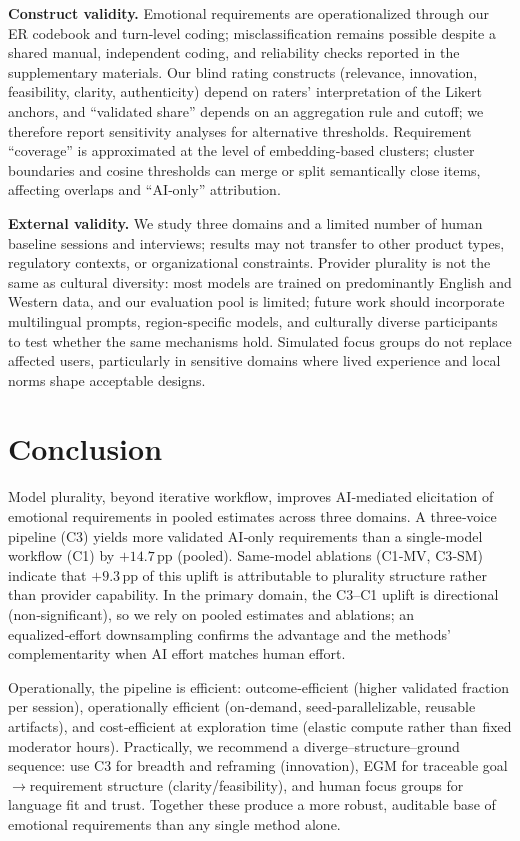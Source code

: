 \documentclass[acmsmall]{acmart}
\begin{document}
\textbf{Construct validity.}
Emotional requirements are operationalized through our ER codebook and turn‑level coding; misclassification remains possible despite a shared manual, independent coding, and reliability checks reported in the supplementary materials. Our blind rating constructs (relevance, innovation, feasibility, clarity, authenticity) depend on raters’ interpretation of the Likert anchors, and “validated share” depends on an aggregation rule and cutoff; we therefore report sensitivity analyses for alternative thresholds. Requirement “coverage” is approximated at the level of embedding‑based clusters; cluster boundaries and cosine thresholds can merge or split semantically close items, affecting overlaps and “AI‑only” attribution.


\textbf{External validity.}
We study three domains and a limited number of human baseline sessions and interviews; results may not transfer to other product types, regulatory contexts, or organizational constraints. Provider plurality is not the same as cultural diversity: most models are trained on predominantly English and Western data, and our evaluation pool is limited; future work should incorporate multilingual prompts, region‑specific models, and culturally diverse participants to test whether the same mechanisms hold. Simulated focus groups do not replace affected users, particularly in sensitive domains where lived experience and local norms shape acceptable designs.


\section{Conclusion}
Model plurality, beyond iterative workflow, improves AI‑mediated elicitation of emotional requirements in pooled estimates across three domains. A three‑voice pipeline (C3) yields more validated AI‑only requirements than a single‑model workflow (C1) by \(+14.7\,\text{pp}\) (pooled). Same‑model ablations (C1‑MV, C3‑SM) indicate that \(+9.3\,\text{pp}\) of this uplift is attributable to plurality structure rather than provider capability. In the primary domain, the C3–C1 uplift is directional (non‑significant), so we rely on pooled estimates and ablations; an equalized‑effort downsampling confirms the advantage and the methods’ complementarity when AI effort matches human effort.

Operationally, the pipeline is efficient: outcome‑efficient (higher validated fraction per session), operationally efficient (on‑demand, seed‑parallelizable, reusable artifacts), and cost‑efficient at exploration time (elastic compute rather than fixed moderator hours). Practically, we recommend a diverge–structure–ground sequence: use C3 for breadth and reframing (innovation), EGM for traceable goal\(\rightarrow\)requirement structure (clarity/feasibility), and human focus groups for language fit and trust. Together these produce a more robust, auditable base of emotional requirements than any single method alone.
\end{document}
